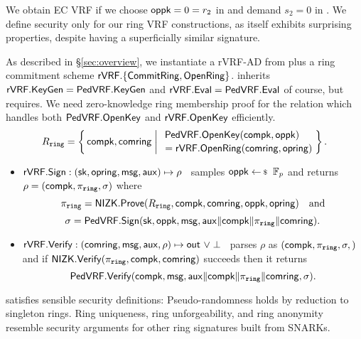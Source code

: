 \noindent We obtain EC VRF if we choose $\mathsf{oppk} = 0 = r_2$ in \Sign and demand $s_2 = 0$ in \Verify.
We define security only for our ring VRF constructions, as \PedVRF itself
exhibits surprising properties, despite having a superficially similar signature.

\smallskip

As described in \S\ref{sec:overview},
we instantiate a rVRF-AD from \PedVRF plus a ring commitment scheme
 ${\mathsf{rVRF}}.\{ {\mathsf{CommitRing}}, {\mathsf{OpenRing}} \}$.
\rVRF inherits ${\mathsf{rVRF}}.{\mathsf{KeyGen}} = {\mathsf{PedVRF}}.{\mathsf{KeyGen}}$ and
 ${\mathsf{rVRF}}.{\mathsf{Eval}} = {\mathsf{PedVRF}}.{\mathsf{Eval}}$ of course, but requires.
We need zero-knowledge ring membership proof for the relation \Rring
which handles both ${\mathsf{PedVRF}}.{\mathsf{OpenKey}}$ and ${\mathsf{rVRF}}.{\mathsf{OpenKey}}$ efficiently.
$$ \Rring = \Setst{ \compk, \comring }{
    \eprint{ \exists \openpk,\openring \textrm{\ s.t.\ } }{}
    \genfrac{}{}{0pt}{}{\PedVRF.\OpenKey(\compk,\openpk) \quad}{\,\, = \rVRF.\OpenRing(\comring,\openring)}
} \mathperiod $$

\begin{itemize}
\item ${\mathsf{rVRF}}.{\mathsf{Sign}} : (\mathsf{sk},\mathsf{opring},\mathsf{msg},\mathsf{aux}) \mapsto \rho$ \,
 samples $\openpk \leftsample \F_p$ and
 returns $\rho = (\mathsf{compk},\pi_{\mathtt{ring}},\sigma)$ where      %
 $$ \pi_{\mathtt{ring}} = {\mathsf{NIZK}}.{\mathsf{Prove}}(R_{\mathtt{ring}},\mathsf{compk},\mathsf{comring},\mathsf{oppk},\mathsf{opring}) \quad\textrm{and} $$
 $$ \sigma = {\mathsf{PedVRF}}.{\mathsf{Sign}}(\mathsf{sk},\mathsf{oppk},\mathsf{msg},\mathsf{aux} \| \mathsf{compk} \| \pi_{\mathtt{ring}} \| \mathsf{comring}) . $$ %
\item ${\mathsf{rVRF}}.{\mathsf{Verify}} : (\mathsf{comring},\mathsf{msg},\mathsf{aux},\rho) \mapsto {\ensuremath{\mathsf{out}}} \,\, \lor \perp$ \,
 parses $\rho$ as $(\mathsf{compk},\pi_{\mathtt{ring}},\sigma,)$ and
 if ${\mathsf{NIZK}}.{\mathsf{Verify}}(\pi_{\mathtt{ring}},\mathsf{compk},\mathsf{comring})$ succeeds then it returns
 $$ {\mathsf{PedVRF}}.{\mathsf{Verify}}(\mathsf{compk},\mathsf{msg},\mathsf{aux} \| \mathsf{compk} \| \pi_{\mathtt{ring}} \| \mathsf{comring},\sigma) . $$
\end{itemize}

\rVRF satisfies sensible security definitions:
Pseudo-randomness holds by reduction to singleton rings.
Ring uniqueness, ring unforgeability, and ring anonymity resemble security
arguments for other ring signatures built from SNARKs.
%
%


